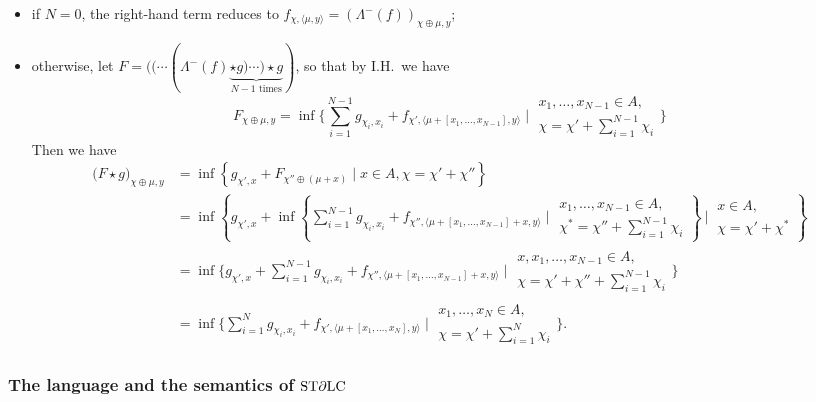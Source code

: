 \begin{itemize}

\item if $N=0$, the right-hand term reduces to 
$f_{\chi, \langle \mu, y\rangle}=(\Lambda^{-}(f))_{\chi\oplus\mu,y}$;

\item otherwise, let $F=(( \cdots (\Lambda^{-}(f) \underbrace{\star g)\cdots )\star g}_{N-1\text{ times}})$, so that by I.H.~we have
$$
F_{\chi\oplus\mu,y}=
\inf\Big \{ 
\sum_{i=1}^{N-1}g_{\chi_{i},x_{i}}+
f_{\chi', \langle\mu+ [x_{1},\dots, x_{N-1}],y\rangle}
\mid 
\begin{matrix}
x_{1},\dots, x_{N-1}\in A,\\
\chi= \chi'+\sum_{i=1}^{N-1}\chi_{i}
\end{matrix}
\Big \}
$$
Then we have
{\small
\begin{align*}
\big( F\star g\big)_{\chi\oplus\mu,y}
&=
\inf \left \{
g_{\chi',x}+F_{\chi''\oplus(\mu+x)}
\mid
x\in A, \chi=\chi'+\chi''
\right\}\\
&=
\inf\left \{ 
g_{\chi',x}+
\inf\left\{
\sum_{i=1}^{N-1}g_{\chi_{i},x_{i}}+
f_{\chi'', \langle\mu+ [x_{1},\dots, x_{N-1}]+x,y\rangle}
\mid 
\begin{matrix}
x_{1},\dots, x_{N-1}\in A,\\
\chi^{*}= \chi''+\sum_{i=1}^{N-1}\chi_{i}
\end{matrix}
\right\}
\ 
\Big\vert \ 
\begin{matrix}
x\in A,\\
\chi=\chi'+\chi^{*}
\end{matrix}
\right \}\\
&=
\inf\Big \{ 
g_{\chi',x}+
\sum_{i=1}^{N-1}g_{\chi_{i},x_{i}}+
f_{\chi'', \langle\mu+ [x_{1},\dots, x_{N-1}]+x,y\rangle}
\mid 
\begin{matrix}
x,x_{1},\dots, x_{N-1}\in A,\\
\chi= \chi'+\chi''+\sum_{i=1}^{N-1}\chi_{i}
\end{matrix}
\Big \}\\
&=
\inf\Big \{ 
\sum_{i=1}^{N}g_{\chi_{i},x_{i}}+
f_{\chi', \langle\mu+ [x_{1},\dots, x_{N}],y\rangle}
\mid 
\begin{matrix}
x_{1},\dots, x_{N}\in A,\\
\chi= \chi'+\sum_{i=1}^{N}\chi_{i}
\end{matrix}
\Big \}.
\end{align*}
}
\end{itemize}

\subsubsection{The language and the semantics of $\mathrm{ST}\partial\mathrm{LC}$}

